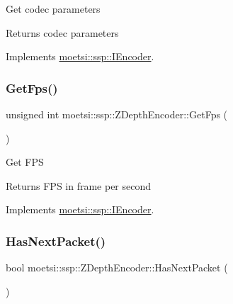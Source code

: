 Get codec parameters \begin{DoxyReturn}{Returns}
codec parameters 
\end{DoxyReturn}


Implements \hyperlink{classmoetsi_1_1ssp_1_1IEncoder_ad5179efaa4c74207766dd64f46f4059a}{moetsi\+::ssp\+::\+I\+Encoder}.

\mbox{\label{classmoetsi_1_1ssp_1_1ZDepthEncoder_a9ea0a5783d7d265fccc3a2c262600552}} 
\subsubsection{\texorpdfstring{Get\+Fps()}{GetFps()}}
{\footnotesize\ttfamily unsigned int moetsi\+::ssp\+::\+Z\+Depth\+Encoder\+::\+Get\+Fps (\begin{DoxyParamCaption}{ }\end{DoxyParamCaption})\hspace{0.3cm}{\ttfamily [virtual]}}

Get F\+PS \begin{DoxyReturn}{Returns}
F\+PS in frame per second 
\end{DoxyReturn}


Implements \hyperlink{classmoetsi_1_1ssp_1_1IEncoder_ae6a865aa52230d81aed1cb5232402f6c}{moetsi\+::ssp\+::\+I\+Encoder}.

\mbox{\label{classmoetsi_1_1ssp_1_1ZDepthEncoder_ac11aa1369150c2aa5ffa1d70d4e6ad5d}} 
\subsubsection{\texorpdfstring{Has\+Next\+Packet()}{HasNextPacket()}}
{\footnotesize\ttfamily bool moetsi\+::ssp\+::\+Z\+Depth\+Encoder\+::\+Has\+Next\+Packet (\begin{DoxyParamCaption}{ }\end{DoxyParamCaption})\hspace{0.3cm}{\ttfamily [virtual]}}

